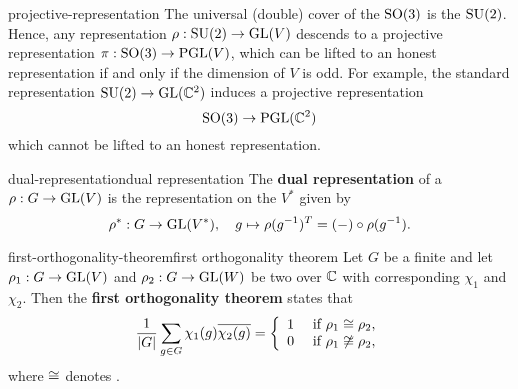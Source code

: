 \begin{example}{projective-representation}
    The universal (double) cover of the  $\textup{SO}(3)$ is the  $\textup{SU}(2)$. Hence, any representation $\rho : \textup{SU}(2) \to \textup{GL}(V)$ descends to a projective representation $\pi : \textup{SO}(3) \to \textup{PGL}(V)$, which can be lifted to an honest representation if and only if the dimension of $V$ is odd. For example, the standard representation $\textup{SU}(2) \to \textup{GL}(\mathbb{C}^2)$ induces a projective representation
    \[ \textup{SO}(3) \to \textup{PGL}(\mathbb{C}^2) \]
    which cannot be lifted to an honest representation.
\end{example}


\begin{topic}{dual-representation}{dual representation}
    The \textbf{dual representation} of a  $\rho : G \to \textup{GL}(V)$ is the representation on the  $V^*$ given by
    \[ \rho^* : G \to \textup{GL}(V^*), \quad g \mapsto \rho(g^{-1})^T = (-) \circ \rho(g^{-1}) . \]
\end{topic}

\begin{topic}{first-orthogonality-theorem}{first orthogonality theorem}
    Let $G$ be a finite  and let $\rho_1 : G \to \textup{GL}(V)$ and $\rho_2 : G \to \textup{GL}(W)$ be two  over $\mathbb{C}$ with corresponding  $\chi_1$ and $\chi_2$. Then the \textbf{first orthogonality theorem} states that
    \[ \frac{1}{|G|} \sum_{g \in G} \chi_1(g) \overline{\chi_2(g)} = \left\{ \begin{array}{cl} 1 & \textup{ if } \rho_1 \cong \rho_2 , \\ 0 & \textup{ if } \rho_1 \not\cong \rho_2 , \end{array} \right. \]
    where $\cong$ denotes .
\end{topic}

